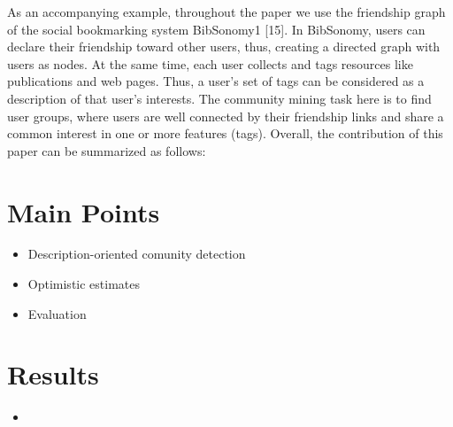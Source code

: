 \documentclass[a4paper]{article}
\begin{document}
As an accompanying example, throughout the paper we use the friendship graph of the social bookmarking system BibSonomy1 [15]. In BibSonomy, users can declare their friendship toward other users, thus, creating a directed graph with users as nodes. At the same time, each user collects and tags resources like publications and web pages. Thus, a user’s set of tags can be considered as a description of that user’s interests. The community mining task here is to find user groups, where users are well connected by their friendship links and share a common interest in one or more features (tags).
Overall, the contribution of this paper can be summarized as follows:

\section{Main Points}
\begin{itemize}
  \item Description-oriented comunity detection
  \item Optimistic estimates
  \item Evaluation
\end{itemize}

\section{Results}
\begin{itemize}
  \item
\end{itemize}
\end{document}

